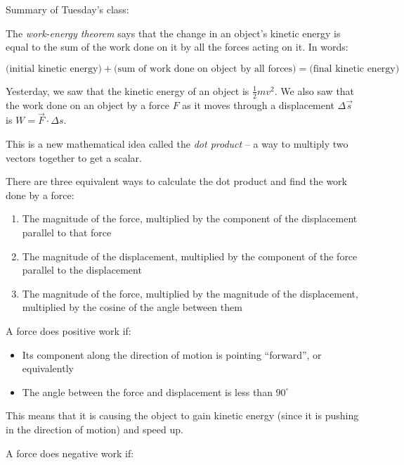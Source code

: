 \documentclass[12pt]{article}
\begin{document}
\Large
\centerline{}

\normalsize
\centerline{}

Summary of Tuesday's class:

The {\it work-energy theorem} says that the change in an object's kinetic energy is equal to the sum of the work done on it by all the forces acting on it. In words:

$$
\text{(initial kinetic energy)} + \text{(sum of work done on object by all forces)} = \text{(final kinetic energy)}
$$

Yesterday, we saw that the kinetic energy of an object is $\frac{1}{2}mv^2$. We also saw that the work done on an object by a force $F$ as it moves through a displacement $\Delta \vec s$ is $W = \vec F \cdot \Delta s.$

This is a new mathematical idea called the {\it dot product} -- a way to multiply two vectors together to get a scalar.

There are three equivalent ways to calculate the dot product and find the work done by a force:

\begin{enumerate}
	\item The magnitude of the force, multiplied by the component of the displacement parallel to that force
	\item The magnitude of the displacement, multiplied by the component of the force parallel to the displacement
	\item The magnitude of the force, multiplied by the magnitude of the displacement, multiplied by the cosine of the angle between them
\end{enumerate}


\bigskip

A force does positive work if:

\begin{itemize}
	\item Its component along the direction of motion is pointing ``forward'', or equivalently
	\item The angle between the force and displacement is less than $90^\circ$
\end{itemize}

This means that it is causing the object to gain kinetic energy (since it is pushing in the direction of motion) and speed up.


\bigskip

A force does negative work if:
\end{document}
